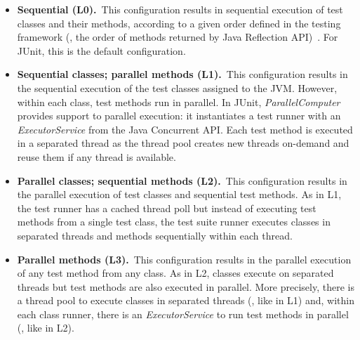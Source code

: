 \newcommand{\Seq}{L0}
\newcommand{\ParClassSeqMeth}{L1}
\newcommand{\SeqClassParMeth}{L2}
\newcommand{\ParClassParMeth}{L3}

\begin{itemize}
\item
    \textbf{Sequential (\Seq).}~This configuration results in
        sequential execution of test classes and their methods,
        according to a given order defined in the testing framework
        (\eg, the order of methods returned by Java Reflection
        API)~\cite{junit-test-order}. For JUnit, this is the default
        configuration.
\item
    \textbf{Sequential classes; parallel methods
        (\ParClassSeqMeth{}).}~This configuration results in the
        sequential execution of the test classes assigned to the JVM.
        However, within each class, test methods run in parallel. In
        JUnit, \emph{ParallelComputer} provides support to parallel
        execution: it instantiates a test runner with an
        \emph{ExecutorService} from the Java Concurrent API. Each test
        method is executed in a separated thread as the thread pool
        creates new threads on-demand and reuse them if any thread is
        available.
\item
    \textbf{Parallel classes; sequential methods
        (\SeqClassParMeth{}).}~This configuration results in the
        parallel execution of test classes and sequential test
        methods. As in \ParClassSeqMeth, the test runner has a cached
        thread poll but instead of executing test methods from a
        single test class, the test suite runner executes classes in
        separated threads and methods sequentially within each thread.
\item
    \textbf{Parallel methods (\ParClassParMeth).}~This configuration
        results in the parallel execution of any test method from any
        class.   As in \SeqClassParMeth, classes execute on separated
        threads but test methods are also executed in parallel. More
        precisely, there is a thread pool to execute classes in
        separated threads (\ie, like in \ParClassSeqMeth) and, within
        each class runner, there is an \emph{ExecutorService} to run
        test methods in parallel (\ie, like in \SeqClassParMeth).
\end{itemize}

